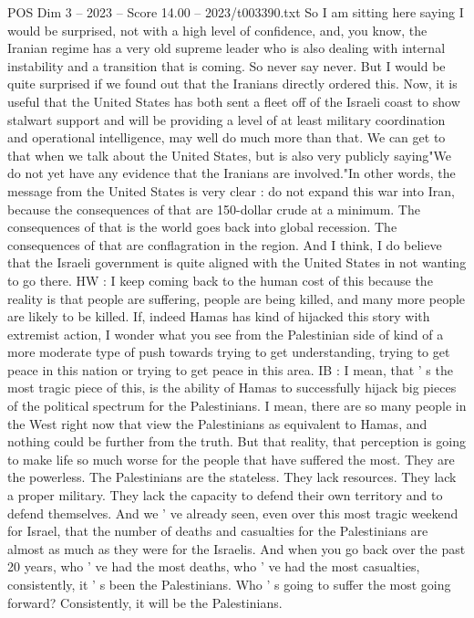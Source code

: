 \begin{textsample}{POS Dim 3 – 2023 – Score 14.00 – 2023/t003390.txt}
So I am sitting here saying I would be surprised, not with a high level of confidence, and, you know, the Iranian regime has a very old supreme leader who is also dealing with internal instability and a transition that is coming.
So never say never.
But I would be quite surprised if we found out that the Iranians directly ordered this.
Now, it is useful that the United States has both sent a fleet off of the Israeli coast to show stalwart support and will be providing a level of at least military coordination and operational intelligence, may well do much more than that.
We can get to that when we talk about the United States, but is also very publicly saying"We do not yet have any evidence that the Iranians are involved."In other words, the message from the United States is very clear : do not expand this war into Iran, because the consequences of that are 150-dollar crude at a minimum.
The consequences of that is the world goes back into global recession.
The consequences of that are conflagration in the region.
And I think, I do believe that the Israeli government is quite aligned with the United States in not wanting to go there.
HW : I keep coming back to the human cost of this because the reality is that people are suffering, people are being killed, and many more people are likely to be killed.
If, indeed Hamas has kind of hijacked this story with extremist action, I wonder what you see from the Palestinian side of kind of a more moderate type of push towards trying to get understanding, trying to get peace in this nation or trying to get peace in this area.
IB : I mean, that ' s the most tragic piece of this, is the ability of Hamas to successfully hijack big pieces of the political spectrum for the Palestinians.
I mean, there are so many people in the West right now that view the Palestinians as equivalent to Hamas, and nothing could be further from the truth.
But that reality, that perception is going to make life so much worse for the people that have suffered the most.
They are the powerless.
The Palestinians are the stateless.
They lack resources.
They lack a proper military.
They lack the capacity to defend their own territory and to defend themselves.
And we ' ve already seen, even over this most tragic weekend for Israel, that the number of deaths and casualties for the Palestinians are almost as much as they were for the Israelis.
And when you go back over the past 20 years, who ' ve had the most deaths, who ' ve had the most casualties, consistently, it ' s been the Palestinians.
Who ' s going to suffer the most going forward?
Consistently, it will be the Palestinians.

\end{textsample}
